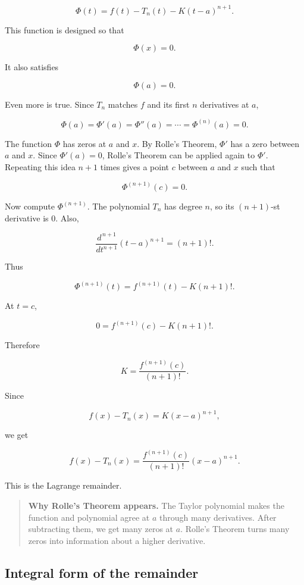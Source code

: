 \[
\Phi(t)=f(t)-T_n(t)-K(t-a)^{n+1}.
\]

This function is designed so that

\[
\Phi(x)=0.
\]

It also satisfies

\[
\Phi(a)=0.
\]

Even more is true.  Since \(T_n\) matches \(f\) and its first \(n\) derivatives at \(a\),

\[
\Phi(a)=\Phi'(a)=\Phi''(a)=\cdots=\Phi^{(n)}(a)=0.
\]

The function \(\Phi\) has zeros at \(a\) and \(x\).  By Rolle's Theorem, \(\Phi'\) has a
zero between \(a\) and \(x\).  Since \(\Phi'(a)=0\), Rolle's Theorem can be applied
again to \(\Phi'\).  Repeating this idea \(n+1\) times gives a point \(c\) between \(a\)
and \(x\) such that

\[
\Phi^{(n+1)}(c)=0.
\]

Now compute \(\Phi^{(n+1)}\).  The polynomial \(T_n\) has degree \(n\), so its
\((n+1)\)-st derivative is \(0\).  Also,

\[
\frac{d^{\,n+1}}{dt^{n+1}}(t-a)^{n+1}=(n+1)!.
\]

Thus

\[
\Phi^{(n+1)}(t)=f^{(n+1)}(t)-K(n+1)!.
\]

At \(t=c\),

\[
0=f^{(n+1)}(c)-K(n+1)!.
\]

Therefore

\[
K=\frac{f^{(n+1)}(c)}{(n+1)!}.
\]

Since

\[
f(x)-T_n(x)=K(x-a)^{n+1},
\]

we get

\[
f(x)-T_n(x)
=
\frac{f^{(n+1)}(c)}{(n+1)!}(x-a)^{n+1}.
\]

This is the Lagrange remainder.

\begin{quote}
\textbf{Why Rolle's Theorem appears.}
The Taylor polynomial makes the function and polynomial agree at \(a\) through many
derivatives.  After subtracting them, we get many zeros at \(a\).  Rolle's Theorem turns
many zeros into information about a higher derivative.
\end{quote}

\subsection{Integral form of the remainder}
\label{subsec:integral-form-remainder}

